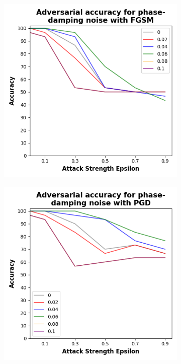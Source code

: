 \begin{figure}[!h]
  \centering

  \begin{subfigure}{0.45\textwidth}
      \includegraphics[width=\linewidth]{figures/evaluation_results/iris/pqc/figures/phase-damping-fgsm.png}
      \label{fig:iris13}
  \end{subfigure} \qquad
  \begin{subfigure}{0.45\textwidth}
      \includegraphics[width=\linewidth]{figures/evaluation_results/iris/pqc/figures/phase-damping-pgd.png}

\end{subfigure}
\end{figure}
